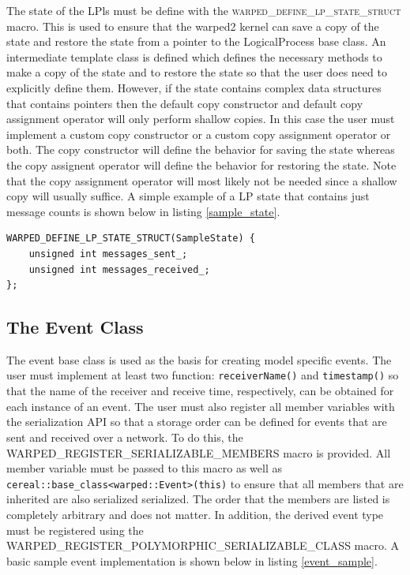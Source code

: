 \documentclass[11pt]{book}
\begin{document}
The state of the LPls must be define with the \textsc{warped\_define\_lp\_state\_struct} macro. This
is used to ensure that the warped2 kernel can save a copy of the state and restore the state from
a pointer to the LogicalProcess base class. An intermediate template class is defined which defines
the necessary methods to make a copy of the state and to restore the state so that the user does
need to explicitly define them. However, if the state contains complex data structures
that contains pointers then the default copy constructor and default copy assignment operator will
only perform shallow copies. In this case the user must implement a custom copy constructor
or a custom copy assignment operator or both. The copy constructor will define the behavior for
saving the state whereas the copy assignent operator will define the behavior for restoring the
state. Note that the copy assignment operator will most likely not be needed since a shallow copy
will usually suffice. A simple example of a LP state that contains just message counts is shown
below in listing \ref{sample_state}.

\begin{lstlisting}[caption=Sample \textsc{warped2} State Definition, label=sample_state, float]
WARPED_DEFINE_LP_STATE_STRUCT(SampleState) {
    unsigned int messages_sent_;
    unsigned int messages_received_;
};
\end{lstlisting}

\subsection{The Event Class}

The event base class is used as the basis for creating model specific events. The user must implement
at least two function: \texttt{receiverName()} and \texttt{timestamp()} so that the name of the
receiver and receive time, respectively, can be obtained for each instance of an event. The user
must also register all member variables with the serialization API so that a storage order can be
defined for events that are sent and received over a network. To do this, the
WARPED\_REGISTER\_SERIALIZABLE\_MEMBERS macro is provided. All member variable must be passed to this
macro as well as \texttt{cereal::base\_class<warped::Event>(this)} to ensure that all members that
are inherited are also serialized serialized. The order that the members are listed is completely
arbitrary and does not matter. In addition, the derived event type must be registered using the
WARPED\_REGISTER\_POLYMORPHIC\_SERIALIZABLE\_CLASS macro. A basic sample event implementation is
shown below in listing \ref{event_sample}.
\end{document}
